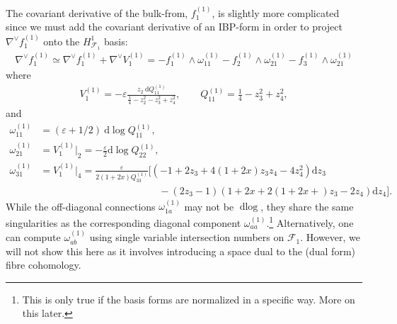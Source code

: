 \documentclass[11pt]{article}
\renewcommand{\d}{\text{d}}
\newcommand{\nn}{\nonumber}
\newcommand{\F}{\mathcal{F}}
\newcommand{\vep}{\varepsilon}
\begin{document}
The covariant derivative of the bulk-from, $f_1^{(1)}$, is slightly more complicated since we must add the covariant derivative of an IBP-form in order to project $\nabla^\vee f_1^{(1)}$ onto the $H^1_{\F_1}$ basis:
\begin{align}
	\nabla^\vee f_1^{(1)} 
	\simeq \nabla^\vee f_1^{(1)} + \nabla^\vee V^{(1)}_1
	= - f_1^{(1)} \wedge \omega_{11}^{(1)} - f_2^{(1)} \wedge \omega_{21}^{(1)} - f_3^{(1)} \wedge \omega_{21}^{(1)}
\end{align}
where 
\begin{align}
	V^{(1)}_{1}
	= - \vep \frac{z_2\ \d Q_{11}^{(1)}}{\frac14-z_2^2-z_3^2+z_4^2},
	\qquad 
	Q_{11}^{(1)} = \frac14{-}z_3^2{+}z_4^2,
\end{align}
and 
\begin{align}
	\omega_{11}^{(1)} &= (\vep+1/2)\ \d\log Q_{11}^{(1)},
	\\	
	\omega_{21}^{(1)} &= V_1^{(1)} \vert_2 = -\frac{\vep}{2} \d\log Q_{22}^{(1)},
	\\ 
	\omega_{31}^{(1)} &= V_1^{(1)} \vert_4 = \frac{\vep}{2(1{+}2x)Q_{33}^{(1)} }
 		\bigg[ 
			\left( - 1 + 2 z_3 + 4(1+2x) z_3 z_4 - 4 z_4^2 \right)	\d z_3
		\nn\\&\hspace{12em} 
			-\left(2 z_3-1\right) \left( 1+2x + 2(1+2x+) z_3 - 2z_4 \right)  \d z_4
		\bigg].
\end{align}
While the off-diagonal connections $\omega^{(1)}_{1a}$ may not be $\d\log$, they share the same singularities as the corresponding diagonal component $\omega^{(1)}_{aa}$.\footnote{This is only true if the basis forms are normalized in a specific way. More on this later.} Alternatively, one can compute $\omega^{(1)}_{ab}$ using single variable intersection numbers on $\F_1$. However, we will not show this here as it involves introducing a space dual to the (dual form) fibre cohomology.
\end{document}
